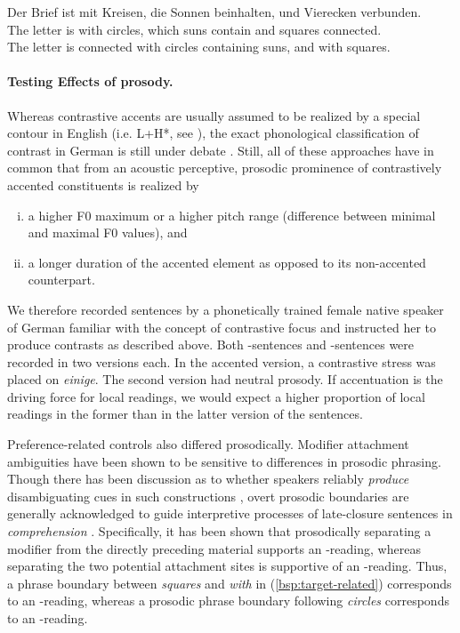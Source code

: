 \documentclass[fleqn,reqno,10pt,draft]{article}
\newcommand{\as}{\acro{as}}
\renewcommand{\es}{\acro{es}}
\newcommand{\lc}{\acro{lc}}
\newcommand{\ec}{\acro{ec}}
\begin{document}
\begin{exe}

\ex \gll Der Brief ist mit Kreisen, die Sonnen beinhalten, und Vierecken
  verbunden. \label{bsp:target-related2}\\
The letter is with circles, which suns contain and squares connected.\\
The letter is connected with circles containing suns, and with squares.  

\end{exe}


\paragraph{Testing Effects of prosody.} Whereas contrastive accents
are usually assumed to be realized by a special contour in English
(i.e. L+H*, see \citet{Pierrehumbert90}), the exact phonological
classification of contrast in German is still under debate
\citep[see][]{Uhmann91,Fery93,Grabe98,Toepel06, Sudhoff10}.  Still,
all of these approaches have in common that from an acoustic
perceptive, prosodic prominence of contrastively accented constituents
is realized by

\begin{enumerate}[(i)]
\item a higher F0 maximum or a higher pitch range (difference 
between minimal and maximal F0 values), and
\item a longer duration of the accented element as opposed to its 
non-accented counterpart.
\end{enumerate}

\noindent We therefore recorded sentences by a phonetically trained
female native speaker of German familiar with the concept of
contrastive focus and instructed her to produce contrasts as described
above. Both \as-sentences and \es-sentences were recorded in two
versions each. In the accented version, a contrastive stress was
placed on {\it einige}. The second version had neutral prosody.  If
accentuation is the driving force for local readings, we would expect
a higher proportion of local readings in the former than in the latter
version of the sentences.

Preference-related controls also differed prosodically. Modifier
attachment ambiguities have been shown to be sensitive to differences
in prosodic phrasing. Though there has been discussion as to whether
speakers reliably \textit{produce} disambiguating cues in such
constructions \citep[e.g.][]{Allbritton96,Kraljik05, Snedeker03,
  Schafer00}, overt prosodic boundaries are generally acknowledged to
guide interpretive processes of late-closure sentences in
\textit{comprehension} \citep[e.g.][]{Steinhauer99, Augurzky06}.
Specifically, it has been shown that prosodically separating a
modifier from the directly preceding material supports an \ec-reading,
whereas separating the two potential attachment sites is supportive of
an \lc-reading. Thus, a phrase boundary between {\it squares} and {\it
  with} in (\ref{bsp:target-related}) corresponds to an \ec-reading,
whereas a prosodic phrase boundary following {\it circles} corresponds
to an \lc-reading.
\end{document}
